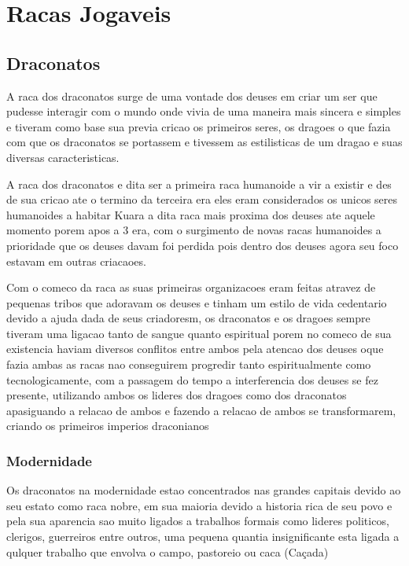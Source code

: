 \documentclass{book}
\begin{document}
\chapter{Racas Jogaveis}
\section{Draconatos}
A raca dos draconatos surge de uma vontade dos deuses em criar um ser que pudesse interagir 
com o mundo onde vivia de uma maneira mais sincera e simples e tiveram como base sua previa 
cricao os primeiros seres, os dragoes o que fazia com que os draconatos se portassem e tivessem as
estilisticas de um dragao e suas diversas caracteristicas.

A raca dos draconatos e dita ser a primeira raca humanoide a vir a existir e des de sua cricao 
ate o termino da terceira era eles eram considerados os unicos seres humanoides a habitar Kuara 
a dita raca mais proxima dos deuses ate aquele momento porem apos  a 3 era, com o surgimento de 
novas racas humanoides a prioridade que os deuses davam 
foi perdida pois dentro dos deuses agora seu foco estavam em outras criacaoes.

Com o comeco da raca as suas primeiras organizacoes eram feitas atravez de pequenas tribos que 
adoravam os deuses e tinham um estilo de vida cedentario devido a ajuda dada de seus criadoresm,
os draconatos e os dragoes sempre tiveram uma ligacao tanto de sangue quanto espiritual 
porem no comeco de sua existencia haviam diversos conflitos entre ambos pela atencao dos deuses
oque fazia ambas as racas nao conseguirem progredir tanto espiritualmente como tecnologicamente, 
com a passagem do tempo a interferencia dos deuses se fez presente, utilizando ambos os lideres 
dos dragoes como dos draconatos apasiguando a relacao de ambos e fazendo a relacao de ambos se 
transformarem, criando os primeiros imperios draconianos 

\subsection*{Modernidade}
Os draconatos na modernidade estao concentrados nas grandes capitais devido ao seu estato como 
raca nobre, em sua maioria devido a historia rica de seu povo e pela sua aparencia sao muito 
ligados a trabalhos formais como lideres politicos, clerigos, guerreiros entre outros, uma 
pequena quantia insignificante esta ligada a qulquer trabalho que envolva o campo, pastoreio ou
caca (Caçada)
\end{document}
